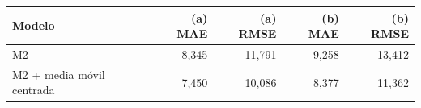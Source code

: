 \begin{tabular}{lrrrr}
\toprule
Modelo & (a) MAE & (a) RMSE & (b) MAE & (b) RMSE \\
\midrule
M2 & 8,345 & 11,791 & 9,258 & 13,412 \\
M2 + media móvil centrada & 7,450 & 10,086 & 8,377 & 11,362 \\
\bottomrule
\end{tabular}
